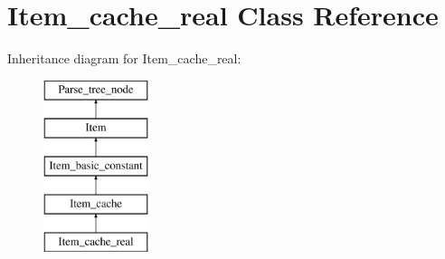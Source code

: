 \hypertarget{classItem__cache__real}{}\section{Item\+\_\+cache\+\_\+real Class Reference}
\label{classItem__cache__real}
Inheritance diagram for Item\+\_\+cache\+\_\+real\+:\begin{figure}[H]
\begin{center}
\leavevmode
\includegraphics[height=5.000000cm]{classItem__cache__real}
\end{center}
\end{figure}

